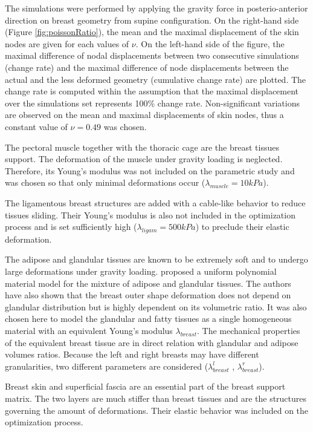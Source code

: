 The simulations were performed by applying the gravity force in posterio-anterior direction on breast geometry from supine configuration. On the right-hand side (Figure \ref{fig:poissonRatio}), the mean and the maximal displacement of the skin nodes are given for each values of $\nu$. On the left-hand side of the figure, the maximal difference of nodal displacements between two consecutive simulations (change rate) and the maximal difference of node displacements between the actual and the less deformed geometry (cumulative change rate) are plotted. The change rate is computed within the assumption that the maximal displacement over the simulations set represents 100\% change rate. Non-significant variations are observed on the mean and maximal displacements of skin nodes, thus a constant value of $\nu = 0.49$ was chosen.


The pectoral muscle together with the thoracic cage are the breast tissues support. The deformation of the muscle under gravity loading is neglected. Therefore, its Young's modulus was not included on the parametric study and was chosen so that only minimal deformations occur ($\lambda_{muscle}=10kPa$).

The ligamentous breast structures are added with a cable-like behavior to reduce tissues sliding. Their Young's modulus is also not included in the optimization process and is set sufficiently high ($\lambda_{ligam}=500kPa$) to preclude their elastic deformation. 

The adipose and glandular tissues are known to be extremely soft and to undergo large deformations under gravity loading.  \cite{calvo_polynomial_2015} proposed a uniform polynomial material model for the mixture of adipose and glandular tissues. The authors have also shown that the breast outer shape deformation does not depend on glandular distribution but is highly dependent on its volumetric ratio. It was also chosen here to model the glandular and fatty tissues as a single homogeneous material with an equivalent Young's modulus $\lambda_{breast }$. The mechanical properties of the equivalent breast tissue are in direct relation with glandular and adipose volumes ratios. Because the left and right breasts may have different granularities, two different parameters are considered ($\lambda_{breast}^l$ , $\lambda_{breast}^r$).

Breast skin and superficial fascia are an essential part of the breast support matrix. The two layers are much stiffer than breast tissues and are the structures governing the amount of deformations. Their elastic behavior was included on the optimization process.

